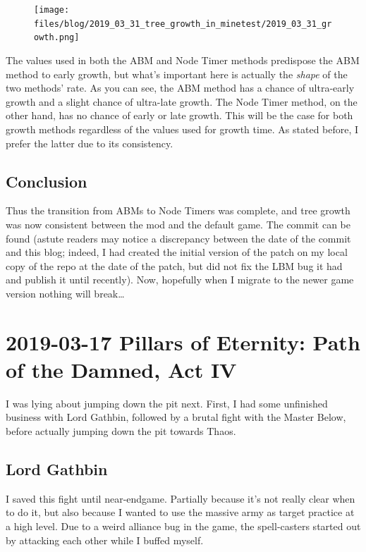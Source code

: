 \documentclass{article}
\begin{document}
\begin{figure}
\texttt{[image: files/blog/2019\_03\_31\_tree\_growth\_in\_minetest/2019\_03\_31\_growth.png]}
\end{figure}

The values used in both the ABM and Node Timer methods predispose the ABM method to early growth, but what's important here is actually the \emph{shape} of the two methods' rate.  As you can see, the ABM method has a chance of ultra-early growth and a slight chance of ultra-late growth.  The Node Timer method, on the other hand, has no chance of early or late growth.  This will be the case for both growth methods regardless of the values used for growth time.  As stated before, I prefer the latter due to its consistency.

\subsection{Conclusion}
Thus the transition from ABMs to Node Timers was complete, and tree growth was now consistent between the mod and the default game.  The commit can be found  (astute readers may notice a discrepancy between the date of the commit and this blog; indeed, I had created the initial version of the patch on my local copy of the repo at the date of the patch, but did not fix the LBM bug it had and publish it until recently).  Now, hopefully when I migrate to the newer game version nothing will break\ldots


\section{2019-03-17 Pillars of Eternity: Path of the Damned, Act IV}
I was lying about jumping down the pit next.  First, I had some unfinished business with Lord Gathbin, followed by a brutal fight with the Master Below, before actually jumping down the pit towards Thaos.

\subsection{Lord Gathbin}
I saved this fight until near-endgame.  Partially because it's not really clear when to do it, but also because I wanted to use the massive army as target practice at a high level.  Due to a weird alliance bug in the game, the spell-casters started out by attacking each other while I buffed myself.
\end{document}
